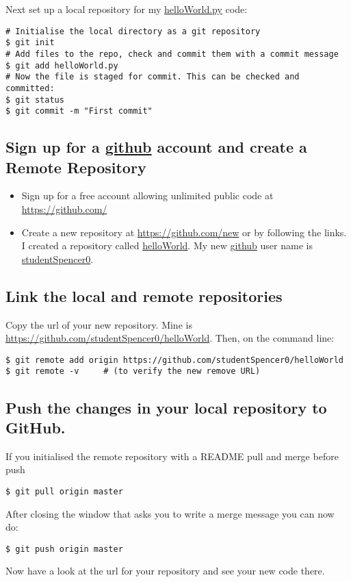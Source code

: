 Next set up a local repository for my \url{helloWorld.py} code:

\begin{lstlisting}
# Initialise the local directory as a git repository
$ git init
# Add files to the repo, check and commit them with a commit message
$ git add helloWorld.py
# Now the file is staged for commit. This can be checked and committed:
$ git status
$ git commit -m "First commit"
\end{lstlisting}
\pause 

\subsection{Sign up for a \protect\url{github} account and create a Remote Repository}
\begin{itemize}
\item Sign up for a free account allowing unlimited public code at \url{https://github.com/}
\item Create a new repository at \url{https://github.com/new} or by following
the links. I created a repository called \url{helloWorld}. My new
\url{github} user name is \url{studentSpencer0}. 
\end{itemize}
\pause 

\subsection{Link the local and remote repositories}

Copy the url of your new repository. Mine is \url{https://github.com/studentSpencer0/helloWorld}.
Then, on the command line:
\begin{lstlisting}
$ git remote add origin https://github.com/studentSpencer0/helloWorld
$ git remote -v     # (to verify the new remove URL)
\end{lstlisting}
\pause 

\subsection{Push the changes in your local repository to GitHub.}

If you initialised the remote repository with a README pull and merge
before push
\begin{lstlisting}
$ git pull origin master
\end{lstlisting}
After closing the window that asks you to write a merge message you
can now do:

\begin{lstlisting}
$ git push origin master
\end{lstlisting}
 Now have a look at the url for your repository and see your new code
there.

